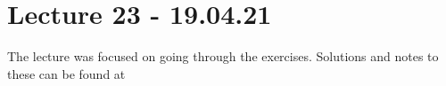 

\section{Lecture 23 - 19.04.21}

The lecture was focused on going through the exercises. Solutions and notes to these can be found at 